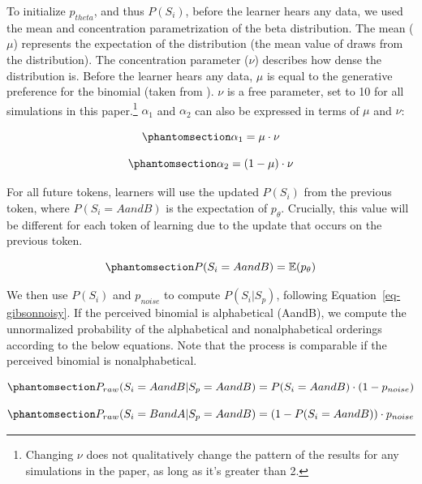 \documentclass[
  12pt,
  letterpaper,
]{scrreprt}
\begin{document}
To initialize \(p_{theta}\), and thus \(P(S_i)\), before the learner
hears any data, we used the mean and concentration parametrization of
the beta distribution. The mean (\(\mu\)) represents the expectation of
the distribution (the mean value of draws from the distribution). The
concentration parameter (\(\nu\)) describes how dense the distribution
is. Before the learner hears any data, \(\mu\) is equal to the
generative preference for the binomial (taken from
). \(\nu\) is a free parameter, set to 10 for all
simulations in this paper.\footnote{Changing \(\nu\) does not
  qualitatively change the pattern of the results for any simulations in
  the paper, as long as it's greater than 2.} \(\alpha_1\) and
\(\alpha_2\) can also be expressed in terms of \(\mu\) and \(\nu\):

\begin{equation}\phantomsection\label{eq-alpha1}{
\alpha_1 = \mu \cdot \nu
}\end{equation}

\begin{equation}\phantomsection\label{eq-alpha2}{
\alpha_2 = (1-\mu) \cdot \nu
}\end{equation}

For all future tokens, learners will use the updated \(P(S_i)\) from the
previous token, where \(P(S_i = AandB)\) is the expectation of
\(p_\theta\). Crucially, this value will be different for each token of
learning due to the update that occurs on the previous token.

\begin{equation}\phantomsection\label{eq-expectationptheta}{
P(S_i = AandB) = \mathbb{E}(p_\theta)
}\end{equation}

We then use \(P(S_i)\) and \(p_{noise}\) to compute \(P(S_i|S_p)\),
following Equation~\ref{eq-gibsonnoisy}. If the perceived binomial is
alphabetical (AandB), we compute the unnormalized probability of the
alphabetical and nonalphabetical orderings according to the below
equations. Note that the process is comparable if the perceived binomial
is nonalphabetical.

\begin{equation}\phantomsection\label{eq-praw}{
P_{raw}(S_i = AandB|S_p = AandB) = P(S_i = AandB) \cdot (1 -  p_{noise})
}\end{equation}

\begin{equation}\phantomsection\label{eq-praw2}{
P_{raw}(S_i = BandA|S_p = AandB) = (1 - P(S_i = AandB)) \cdot p_{noise}
}\end{equation}
\end{document}
